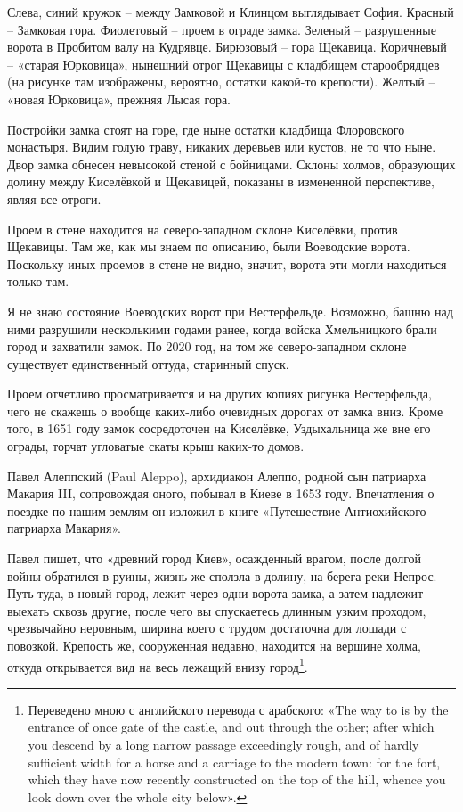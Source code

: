 Слева, синий кружок – между Замковой и Клинцом выглядывает София. Красный – Замковая гора. Фиолетовый – проем в ограде замка. Зеленый – разрушенные ворота в Пробитом валу на Кудрявце. Бирюзовый – гора Щекавица. Коричневый – «старая Юрковица», нынешний отрог Щекавицы с кладбищем старообрядцев (на рисунке там изображены, вероятно, остатки какой-то крепости). Желтый – «новая Юрковица», прежняя Лысая гора.

Постройки замка стоят на горе, где ныне остатки кладбища Флоровского монастыря. Видим голую траву, никаких деревьев или кустов, не то что ныне. Двор замка обнесен невысокой стеной с бойницами. Склоны холмов, образующих долину между Киселёвкой и Щекавицей, показаны в измененной перспективе, являя все отроги. 

Проем в стене находится на северо-западном склоне Киселёвки, против Щекавицы. Там же, как мы знаем по описанию, были Воеводские ворота. Поскольку иных проемов в стене не видно, значит, ворота эти могли находиться только там.

Я не знаю состояние Воеводских ворот при Вестерфельде. Возможно, башню над ними разрушили несколькими годами ранее, когда войска Хмельницкого брали город и захватили замок. По 2020 год, на том же северо-западном склоне существует единственный оттуда, старинный спуск.

Проем отчетливо просматривается и на других копиях рисунка Вестерфельда, чего не скажешь о вообще каких-либо очевидных дорогах от замка вниз. Кроме того, в 1651 году замок сосредоточен на Киселёвке, Уздыхальница же вне его ограды, торчат угловатые скаты крыш каких-то домов.

Павел Алеппский (Paul Aleppo), архидиакон Алеппо, родной сын патриарха Макария III, сопровождая оного, побывал в Киеве в 1653 году. Впечатления о поездке по нашим землям он изложил в книге «Путешествие Антиохийского патриарха Макария»\cite{alepp02}. 

Павел пишет, что «древний город Киев», осажденный врагом, после долгой войны обратился в руины, жизнь же сползла в долину, на берега реки Непрос. Путь туда, в новый город, лежит через одни ворота замка, а затем надлежит выехать сквозь другие, после чего вы спускаетесь длинным узким проходом, чрезвычайно неровным, ширина коего с трудом достаточна для лошади с повозкой. Крепость же, сооруженная недавно, находится на вершине холма, откуда открывается вид на весь лежащий внизу город\footnote{Переведено мною с английского перевода с арабского: «The way to is by the entrance of once gate of the castle, and out through the other; after which you descend by a long narrow passage exceedingly rough, and of hardly sufficient width for a horse and a carriage to the modern town: for the fort, which they have now recently constructed on the top of the hill, whence you look down over the whole city below».}.

